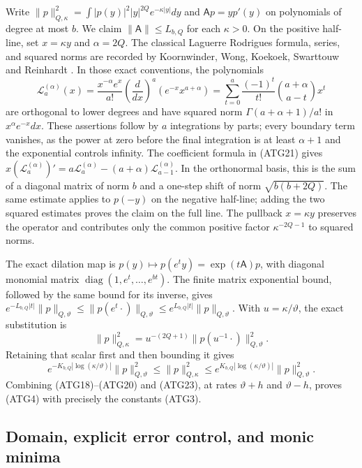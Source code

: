 Write $\|p\|_{Q,\kappa}^2=\int|p(y)|^2|y|^{2Q}
e^{-\kappa|y|}dy$ and $\mathsf A p=yp'(y)$ on polynomials of
degree at most $b$. We claim
$\|\mathsf A\|\le L_{b,Q}$ for each $\kappa>0$.
On the positive half-line, set $x=\kappa y$ and $\alpha=2Q$.
The classical Laguerre Rodrigues formula, series, and squared norms
are recorded by Koornwinder, Wong, Koekoek, Swarttouw and Reinhardt
\cite[Table~18.3.1; eq.~(18.5.5), Table~18.5.1;
eq.~(18.5.12)]{human:dlmf18}. In those exact conventions, the polynomials
\[
 \mathcal L_a^{(\alpha)}(x)
 =\frac{x^{-\alpha}e^x}{a!}
          \left(\frac d{dx}\right)^a(e^{-x}x^{a+\alpha})
 =\sum_{t=0}^a\frac{(-1)^t}{t!}
                         \binom{a+\alpha}{a-t}x^t
\tag{ATG21}
\]
are orthogonal to lower degrees and have squared norm
$\Gamma(a+\alpha+1)/a!$ in $x^\alpha e^{-x}dx$.
These assertions follow by $a$ integrations by parts; every boundary
term vanishes, as the power at zero before the final integration is
at least $\alpha+1$ and the exponential controls infinity.
The coefficient formula in (ATG21) gives
$x(\mathcal L_a^{(\alpha)})'
=a\mathcal L_a^{(\alpha)}-(a+\alpha)\mathcal L_{a-1}^{(\alpha)}$.
In the orthonormal basis, this is the sum of a diagonal matrix of
norm $b$ and a one-step shift of norm $\sqrt{b(b+2Q)}$.
The same estimate applies to $p(-y)$ on the negative half-line;
adding the two squared estimates proves the claim on the full line.
The pullback $x=\kappa y$ preserves the operator and contributes
only the common positive factor $\kappa^{-2Q-1}$ to squared norms.

The exact dilation map is $p(y)\mapsto p(e^ty)=\exp(t\mathsf A)p$,
with diagonal monomial matrix $\operatorname{diag}(1,e^t,\ldots,e^{bt})$.
The finite matrix exponential bound, followed by the same bound for
its inverse, gives
$e^{-L_{b,Q}|t|}\|p\|_{Q,\vartheta}
\le\|p(e^t\cdot)\|_{Q,\vartheta}
\le e^{L_{b,Q}|t|}\|p\|_{Q,\vartheta}$.
With $u=\kappa/\vartheta$, the exact substitution is
\[
 \|p\|_{Q,\kappa}^2
 =u^{-(2Q+1)}\|p(u^{-1}\cdot)\|_{Q,\vartheta}^2.
\tag{ATG22}
\]
Retaining that scalar first and then bounding it gives
\[
 e^{-K_{b,Q}|\log(\kappa/\vartheta)|}\|p\|_{Q,\vartheta}^2
 \le\|p\|_{Q,\kappa}^2
 \le e^{K_{b,Q}|\log(\kappa/\vartheta)|}\|p\|_{Q,\vartheta}^2.
\tag{ATG23}
\]
Combining (ATG18)--(ATG20) and (ATG23), at rates
$\vartheta+h$ and $\vartheta-h$, proves (ATG4) with precisely
the constants (ATG3).

\subsection{Domain, explicit error control, and monic minima}

